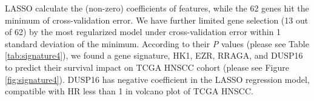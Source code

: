 \documentclass[preprint,12pt]{elsarticle}
\newenvironment{MyColorPar}[1]{%
    \leavevmode\color{#1}\ignorespaces%
}{%
}%
\begin{document}
\begin{MyColorPar}{blue}
LASSO calculate the (non-zero) coefficients of features, while the 62 genes hit the minimum of cross-validation error.
We have further limited gene selection (13 out of 62) by the most regularized model under cross-validation error within 1 standard deviation of the minimum.
According to their \textit{P} values (please see Table \ref{tab:signature4}), 
we found a gene signature, HK1, EZR, RRAGA, and DUSP16 to predict their survival impact on TCGA HNSCC cohort (please see Figure \ref{fig:signature4}).
DUSP16 has negative coefficient in the LASSO regression model, compatible with HR less than 1 in volcano plot of TCGA HNSCC.



\end{MyColorPar}
\end{document}
